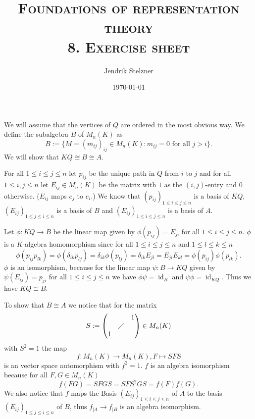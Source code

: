 \documentclass[a4paper,10pt]{article}
\title{\textsc{Foundations of representation theory \\ \Large 8. Exercise sheet}}
\author{Jendrik Stelzner}
\date{\today}
\theoremstyle{definition}
\newcommand{\id}{\operatorname{id}}
\begin{document}
\maketitle





\section{}
We will assume that the vertices of $Q$ are ordered in the most obvious way. We define the subalgebra $B$ of $M_n(K)$ as
\[
 B := \{M = (m_{ij})_{ij} \in M_n(K) : m_{ij} = 0 \text{ for all } j > i \}.
\]
We will show that $KQ \cong B \cong A$.

For all $1 \leq i \leq j \leq n$  let $p_{ij}$ be the unique path in $Q$ from $i$ to $j$ and for all $1 \leq i, j \leq n$ let $E_{ij} \in M_n(K)$ be the matrix with $1$ as the $(i,j)$-entry and $0$ otherwise. ($E_{ij}$ maps $e_j$ to $e_i$.) We know that $(p_{ij})_{1 \leq i \leq j \leq n}$ is a basis of $KQ$, $(E_{ij})_{1 \leq j \leq i \leq n}$ is a basis of $B$ and $(E_{ij})_{1 \leq i \leq j \leq n}$ is a basis of $A$.

Let $\phi : KQ \rightarrow B$ be the linear map given by $\phi(p_{ij}) = E_{ji}$ for all $1 \leq i \leq j \leq n$. $\phi$ is a $K$-algebra homomorphism since for all $1 \leq i \leq j \leq n$ and $1 \leq l \leq k \leq n$
\begin{equation*}
 \phi(p_{ij} p_{lk})
 = \phi(\delta_{ik} p_{lj})
 = \delta_{ik} \phi(p_{lj})
 = \delta_{ik} E_{jl}
 = E_{ji} E_{kl}
 = \phi(p_{ij}) \phi(p_{lk}).
\end{equation*}
$\phi$ is an isomorphism, because for the linear map $\psi: B \rightarrow KQ$ given by $\psi(E_{ij}) = p_{ji}$ for all $1 \leq i \leq j \leq n$ we have $\phi \psi = \id_B$ and $\psi \phi = \id_{KQ}$. Thus we have $KQ \cong B$.

To show that $B \cong A$ we notice that for the matrix
\[
 S :=
 \begin{pmatrix}
    &         & 1 \\
    & \diagup &   \\
  1 &         & 
 \end{pmatrix}
 \in M_n(K)
\]
with $S^2 = 1$ the map
\[
 f : M_n(K) \rightarrow M_n(K), F \mapsto SFS
\]
is an vector space automorphism with $f^2 = 1$. $f$ is an algebra isomorphism because for all $F,G \in M_n(K)$
\[
 f(FG) = SFGS = SFS^2GS = f(F)f(G).
\]
We also notice that $f$ maps the Basis $(E_{ij})_{1 \leq i \leq j \leq n}$ of $A$ to the basis $(E_{ij})_{1 \leq j \leq i \leq n}$ of $B$, thus $f_{|A} \rightarrow f_{|B}$ is an algebra isomorphism.
\end{document}
